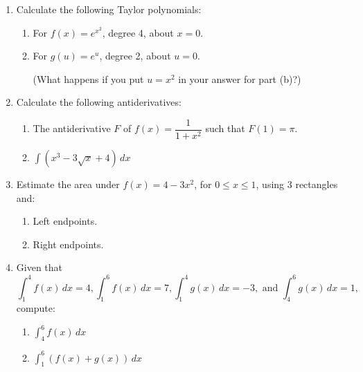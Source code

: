 \documentclass[12pt]{article}
\newcommand{\points}[1]{\marginpar{\hspace{24pt}[#1]}}
\newcommand{\di}{\displaystyle}
\begin{document}
\begin{enumerate}
  \item Calculate the following Taylor polynomials:
  \begin{enumerate}
  \item For $f(x)=e^{x^2}$, degree 4, about $x=0$. \points{4}
  
  \vspace{2in}
  
  \item For $g(u)=e^u$, degree 2, about $u=0$. \points{2}
  
  \vspace{1in}
  
  (What happens if you put $u=x^2$ in your answer for part (b)?)
  
  \bigskip
  
  \bigskip
  
  \end{enumerate}
  \item Calculate the following antiderivatives:
  \begin{enumerate}
  \item The antiderivative $F$ of $f(x) = \dfrac{1}{1+x^2}$ such that $F(1) = \pi$. \points{3}
  
  \vspace{2in}
  
  \item $\di \int (x^3-3\sqrt{x}+4)\,dx$\points{3}
\end{enumerate}    
  \newpage
  
  \item Estimate the area under $f(x) = 4-3x^2$, for $0\leq x\leq 1$, using 3 rectangles and:
  \begin{enumerate}
  \item Left endpoints. \points{3}
  
  \vspace{2.5in}
  
  \item Right endpoints. \points {3}
  
  \vspace{2in}
  
  \end{enumerate}

\item Given that 
\[
\int_1^4 f(x)\,dx = 4, \int_1^6 f(x)\,dx = 7, \int_1^4 g(x)\,dx = -3, \text{ and } \int_4^6 g(x)\,dx = 1,
\]
compute:
\begin{enumerate}
\item $\di \int_4^6 f(x)\,dx$\points{2}

\vspace{1in}

\item $\di \int_1^6 (f(x)+g(x))\,dx$ \points{2}
\end{enumerate}
\end{enumerate}
\end{document}

